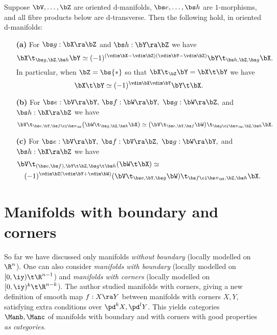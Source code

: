 \documentclass{article}
\begin{document}
\begin{prop} Suppose $\bV,\ldots,\bZ$ are oriented d-manifolds,
$\bs e,\ldots,\bs h$ are $1$-morphisms, and all fibre products below
are d-transverse. Then the following hold, in oriented d-manifolds:
\begin{itemize}
\setlength{\itemsep}{0pt}
\setlength{\parsep}{0pt}
\item[{\bf(a)}] For\/ $\bs g:\bX\ra\bZ$ and\/
$\bs h:\bY\ra\bZ$ we have
\begin{equation*}
\bX\t_{\bs g,\bZ,\bs h}\bY\simeq(-1)^{(\vdim \bX-\vdim\bZ)(\vdim
\bY-\vdim \bZ)}\bY\t_{\bs h,\bZ,\bs g}\bX.
\end{equation*}
In particular, when $\bZ=\bs{*}$ so that\/
$\bX\t_\bZ\bY=\bX\t\bY$ we have
\begin{equation*}
\bX\t\bY\simeq(-1)^{\vdim \bX\vdim \bY}\bY\t\bX.
\end{equation*}
\item[{\bf(b)}] For\/ $\bs e:\bV\ra\bY,$ $\bs f:\bW\ra\bY,$ $\bs
g:\bW\ra\bZ,$ and\/ $\bs h:\bX\ra\bZ$ we have
\begin{equation*}
\bV\t_{\bs e,\bY,\bs f\ci\bs\pi_\bW}\bigl(\bW\t_{\bs g,\bZ,\bs
h}\bX\bigr)\simeq \bigl(\bV\t_{\bs e,\bY,\bs f}\bW\bigr)\t_{\bs
g\ci\bs\pi_\bW,\bZ,\bs h}\bX.
\end{equation*}
\item[{\bf(c)}] For\/ $\bs e:\bV\ra\bY,$ $\bs f:\bV\ra\bZ,$
$\bs g:\bW\ra\bY,$ and\/ $\bs h:\bX\ra\bZ$ we
have
\begin{align*}
&\bV\t_{(\bs e,\bs f),\bY\t\bZ,\bs g\t\bs h}(\bW\t\bX)\simeq \\
&\quad(-1)^{\vdim\bZ(\vdim\bY+\vdim\bW)} (\bV\t_{\bs e,\bY,\bs
g}\bW)\t_{\bs f\ci\bs\pi_\bV,\bZ,\bs h}\bX.
\end{align*}
\end{itemize}
\label{ds4prop4}
\end{prop}

\section[Manifolds with boundary and manifolds with
corners]{Manifolds with boundary and corners}
\label{ds5}

So far we have discussed only manifolds {\it without boundary\/}
(locally modelled on $\R^n$). One can also consider {\it manifolds
with boundary\/} (locally modelled on $[0,\iy)\t\R^{n-1}$) and {\it
manifolds with corners} (locally modelled on $[0,\iy)^k\t\R^{n-k}$).
The author \cite{Joyc3} studied manifolds with corners, giving a new
definition of smooth map $f:X\ra Y$ between manifolds with corners
$X,Y$, satisfying extra conditions over $\pd^kX,\pd^lY$. This yields
categories $\Manb,\Manc$ of manifolds with boundary and with corners
with good properties {\it as categories}.
\end{document}
